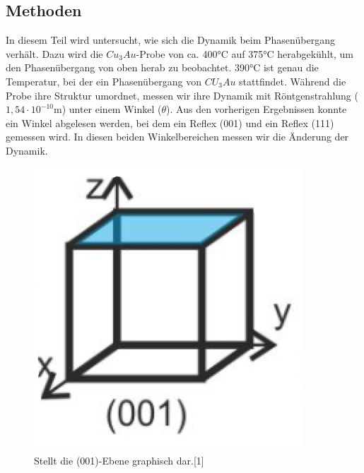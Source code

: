 \documentclass[
	a4paper,
	12pt,
	pagesize,
	ngerman
]{scrartcl}
\begin{document}
\subsection{Methoden}
In diesem Teil wird untersucht, wie sich die Dynamik beim Phasenübergang verhält. Dazu wird die $Cu_3Au$-Probe von ca. 400°C auf 375°C herabgekühlt, um den Phasenübergang von oben herab zu beobachtet. 390°C ist genau die Temperatur, bei der ein Phasenübergang von $CU_3Au$ stattfindet. Während die Probe ihre Struktur umordnet, messen wir ihre Dynamik mit Röntgenstrahlung ($1,54 \cdot 10^{-10}$m) unter einem Winkel ($\theta$). Aus den vorherigen Ergebnissen konnte ein Winkel abgelesen werden,
bei dem ein Reflex (001) und ein Reflex (111) gemessen wird. In diesen beiden Winkelbereichen messen wir die Änderung der Dynamik.
\begin{figure}[h!]
    \centering
        \begin{minipage}[t]{0.45\linewidth}
            \centering
            \includegraphics[scale = 0.4]{001.png}
            \caption{Stellt die (001)-Ebene graphisch dar.[1]}
            \label{A1}
        \end{minipage}
        \hfill
        \begin{minipage}[t]{0.45\linewidth}
            \centering

\end{minipage}
\end{figure}
\end{document}
